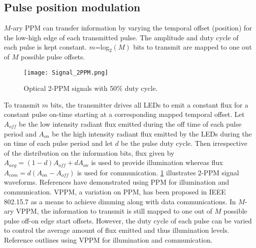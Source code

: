 \subsection{Pulse position modulation}
\label{subsec:sisoModulationPPM}
$M$-ary PPM can transfer information by varying the temporal offset (position) for the low-high edge of each transmitted pulse. The amplitude and duty cycle of each pulse is kept constant. $m$=log$^{ }_{2}(M)$ bits to transmit are mapped to one out of $M$ possible pulse offsets. 
\begin{figure}[!t]
	\centering
		\texttt{[image: Signal\_2PPM.png]}
		\caption[Optical PPM signals]{Optical 2-PPM signals with 50$\%$ duty cycle.}
		\label{fig:sisoSig2PPM}
\end{figure}
To transmit $m$ bits, the transmitter drives all LEDs to emit a constant flux for a constant pulse on-time starting at a corresponding mapped temporal offset. Let $A_{off}$ be the low intensity radiant flux emitted during the off time of each pulse period and $A_{on}$ be the high intensity radiant flux emitted by the LEDs during the on time of each pulse period and let $d$ be the pulse duty cycle. Then irrespective of the distribution on the information bits, flux given by $A_{avg} = (1-d)A_{off} + dA_{on}$ is used to provide illumination whereas flux $A_{com} = d(A_{on}-A_{off})$ is used for communication. \figurename{ \ref{fig:sisoSig2PPM}} illustrates $2$-PPM signal waveforms. References \cite{bai10a} have demonstrated using PPM for illumination and communication. VPPM, a variation on PPM, has been proposed in IEEE 802.15.7  as a means to achieve dimming along with data communications. In $M$-ary VPPM, the information to transmit is still mapped to one out of $M$ possible pulse off-on edge start offsets. However, the duty cycle of each pulse can be varied to control the average amount of flux emitted and thus illumination levels. Reference \cite{raj12a} outlines using VPPM for illumination and communication.

